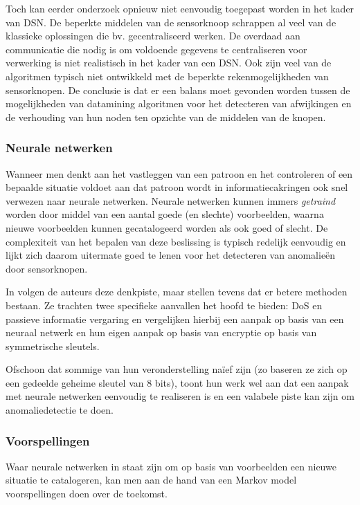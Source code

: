 Toch kan eerder onderzoek opnieuw niet eenvoudig toegepast worden in het kader
van DSN. De beperkte middelen van de sensorknoop schrappen al veel van de
klassieke oplossingen die bv. gecentraliseerd werken. De overdaad aan
communicatie die nodig is om voldoende gegevens te centraliseren voor
verwerking is niet realistisch in het kader van een DSN. Ook zijn veel van de
algoritmen typisch niet ontwikkeld met de beperkte rekenmogelijkheden van
sensorknopen. De conclusie is dat er een balans moet gevonden worden tussen de
mogelijkheden van datamining algoritmen voor het detecteren van afwijkingen en
de verhouding van hun noden ten opzichte van de middelen van de knopen.

\subsubsection*{Neurale netwerken}
\label{subsubsection:neuralnetworks}

Wanneer men denkt aan het vastleggen van een patroon en het controleren of een
bepaalde situatie voldoet aan dat patroon wordt in informatiecakringen ook snel
verwezen naar neurale netwerken. Neurale netwerken kunnen immers
\emph{getraind} worden door middel van een aantal goede (en slechte)
voorbeelden, waarna nieuwe voorbeelden kunnen gecatalogeerd worden als ook goed
of slecht. De complexiteit van het bepalen van deze beslissing is typisch
redelijk eenvoudig en lijkt zich daarom uitermate goed te lenen voor het
detecteren van anomalie\"en door sensorknopen.

In \citep{ramesh2012wireless} volgen de auteurs deze denkpiste, maar stellen
tevens dat er betere methoden bestaan. Ze trachten twee specifieke aanvallen
het hoofd te bieden: DoS en passieve informatie vergaring en vergelijken
hierbij een aanpak op basis van een neuraal netwerk en hun eigen aanpak op
basis van encryptie op basis van symmetrische sleutels.

Ofschoon dat sommige van hun veronderstelling na\"ief zijn (zo baseren ze zich
op een gedeelde geheime sleutel van 8 bits), toont hun werk wel aan dat een
aanpak met neurale netwerken eenvoudig te realiseren is en een valabele piste
kan zijn om anomaliedetectie te doen.

\subsubsection*{Voorspellingen}
\label{subsubsection:predictions}

Waar neurale netwerken in staat zijn om op basis van voorbeelden een nieuwe
situatie te catalogeren, kan men aan de hand van een Markov model
voorspellingen doen over de toekomst.


